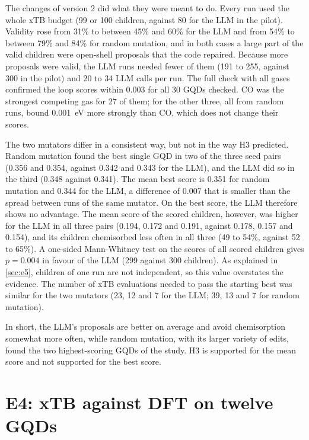 The changes of version 2 did what they were meant to do. Every run used the whole xTB budget (99
or 100 children, against 80 for the LLM in the pilot). Validity rose from 31\% to between 45\% and
60\% for the LLM and from 54\% to between 79\% and 84\% for random mutation, and in both cases a
large part of the valid children were open-shell proposals that the code repaired. Because more
proposals were valid, the LLM runs needed fewer of them (191 to 255, against 300 in the pilot) and
20 to 34 LLM calls per run. The full check with all gases confirmed the loop scores within 0.003
for all 30 GQDs checked. CO was the strongest competing gas for 27 of them; for the other three,
all from random runs,  bound 0.001~eV more strongly than CO, which does not change their
scores.

The two mutators differ in a consistent way, but not in the way H3 predicted. Random mutation found
the best single GQD in two of the three seed pairs (0.356 and 0.354, against 0.342 and 0.343 for
the LLM), and the LLM did so in the third (0.348 against 0.341). The mean best score is 0.351 for
random mutation and 0.344 for the LLM, a difference of 0.007 that is smaller than the spread
between runs of the same mutator. On the best score, the LLM therefore shows no advantage. The mean
score of the scored children, however, was higher for the LLM in all three pairs (0.194, 0.172 and
0.191, against 0.178, 0.157 and 0.154), and its children chemisorbed  less often in all
three (49 to 54\%, against 52 to 65\%). A one-sided Mann-Whitney test on the scores of all scored
children gives \(p = 0.004\) in favour of the LLM (299 against 300 children). As explained in
\cref{sec:e5}, children of one run are not independent, so this value overstates the evidence. The
number of xTB evaluations needed to pass the starting best was similar for the two mutators (23,
12 and 7 for the LLM; 39, 13 and 7 for random mutation).

In short, the LLM's proposals are better on average and avoid chemisorption somewhat more often,
while random mutation, with its larger variety of edits, found the two highest-scoring GQDs of the
study. H3 is supported for the mean score and not supported for the best score.

\section{E4: xTB against DFT on twelve GQDs}
\label{sec:res-e4}

